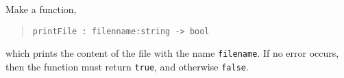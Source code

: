 \label{cat:printFile}
Make a function,
\begin{quote}
  \mbox{\lstinline!printFile : filenname:string -> bool!}
\end{quote}
which prints the content of the file with the name
\lstinline{filename}. If no error occurs, then the function must
return \lstinline{true}, and otherwise \lstinline{false}.
